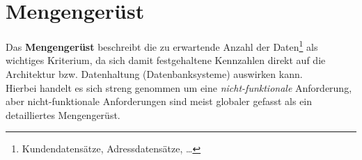 \section{Mengengerüst}

\begin{tcolorbox}[title=Mengengerüst]
    Das \textbf{Mengengerüst} beschreibt die zu erwartende Anzahl der Daten\footnote{Kundendatensätze, Adressdatensätze, \ldots} als wichtiges Kriterium, da sich damit festgehaltene Kennzahlen direkt auf die Architektur bzw. Datenhaltung (Datenbanksysteme) auswirken kann.\\

    \noindent
    Hierbei handelt es sich streng genommen um eine \textit{nicht-funktionale} Anforderung, aber nicht-funktionale Anforderungen sind meist globaler gefasst als ein detailliertes Mengengerüst.
\end{tcolorbox}


